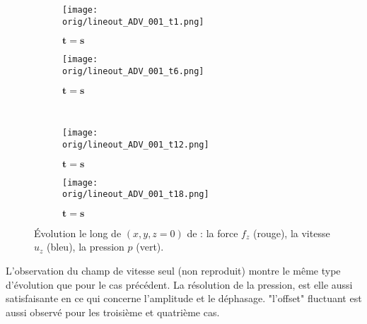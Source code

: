 \begin{figure}
\begin{center}
	\begin{subfigure}[t]{0.4\textwidth}                                                                                                                                   
		\texttt{[image: \\orig/lineout\_ADV\_001\_t1.png]}
		\caption{ $\bm{t=s}$}
		\label{fig : 001_t1}
	\end{subfigure}\hfill
	\begin{subfigure}[t]{0.4\textwidth}
		\texttt{[image: \\orig/lineout\_ADV\_001\_t6.png]}
		\caption{ $\bm{t=s}$}
		\label{fig : 001_t6}
	\end{subfigure}
\\
	\begin{subfigure}[t]{0.4\textwidth}
		\texttt{[image: \\orig/lineout\_ADV\_001\_t12.png]}
		\caption{ $\bm{t=s}$}
		\label{fig : 001_t11}
	\end{subfigure}\hfill
	\begin{subfigure}[t]{0.4\textwidth}
		\texttt{[image: \\orig/lineout\_ADV\_001\_t18.png]}
		\caption{ $\bm{t=s}$}
		\label{fig : 001_t16}
	\end{subfigure}
\end{center}
\caption{Évolution le long de $(x,y,z=0)$ de : la force $f_z$ (rouge), la vitesse $u_z$ (bleu), la pression $p$ (vert).}
\label{fig : 001}
\end{figure}


L'observation du champ de vitesse seul (non reproduit) montre le même type d'évolution que pour le cas précédent. La résolution de la pression, est elle aussi satisfaisante en ce qui concerne l'amplitude et le déphasage. "l'offset" fluctuant est aussi observé pour les troisième et quatrième cas.